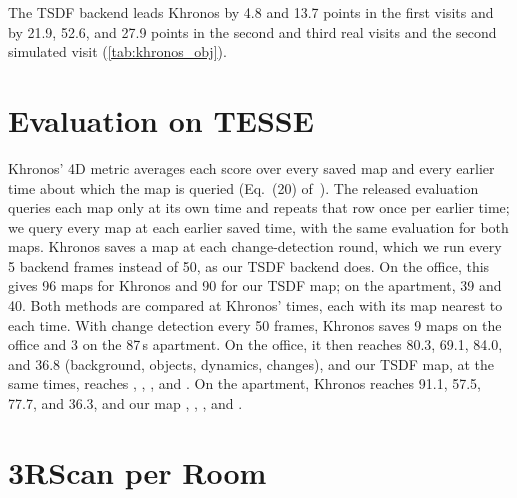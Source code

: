 The TSDF backend leads Khronos by 4.8 and 13.7 points in the first visits and by 21.9, 52.6, and 27.9 points in the
second and third real visits and the second simulated visit (\cref{tab:khronos_obj}).

\section{Evaluation on TESSE}
\label{sec:supp_tesse}

Khronos' 4D metric averages each score over every saved map and every earlier time about which the map is queried
(Eq.~(20) of~\cite{schmid2024khronos}). The released evaluation queries each map only at its own time and repeats that
row once per earlier time; we query every map at each earlier saved time, with the same evaluation for both maps.
Khronos saves a map at each change-detection round, which we run every 5 backend frames instead of 50, as our TSDF
backend does. On the office, this gives 96 maps for Khronos and 90 for our TSDF map; on the apartment, 39 and 40. Both
methods are compared at Khronos' times, each with its map nearest to each time. With change detection every 50 frames,
Khronos saves 9 maps on the office and 3 on the 87\,s apartment. On the office, it then reaches 80.3, 69.1, 84.0, and 36.8
(background, objects, dynamics, changes), and our TSDF map, at the same times, reaches , ,
, and . On the apartment, Khronos reaches 91.1, 57.5, 77.7, and 36.3, and our map ,
, , and .

\section{3RScan per Room}
\label{sec:supp_3rscan}

